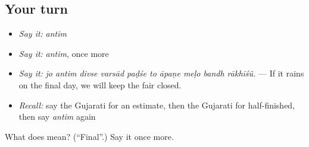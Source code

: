 \subsection*{Your turn}
\begin{itemize}
\raggedright
  \item \emph{Say it:} \emph{antim}
  \item \emph{Say it:} \emph{antim}, once more
  \item \emph{Say it:} \emph{jo antim divse varsād paḍśe to āpaṇe meḷo bandh rākhīśũ.} — If it rains on the final day, we will keep the fair closed.
  \item \emph{Recall:} say the Gujarati for an estimate, then the Gujarati for half-finished, then say \emph{antim} again
\end{itemize}

\begin{tcolorbox}[breakable,colback=teal!4,colframe=teal!35!black,title={Before you move on}]
What does  mean? (\textquotedblleft{}Final\textquotedblright{}.) Say it once more.
\end{tcolorbox}

